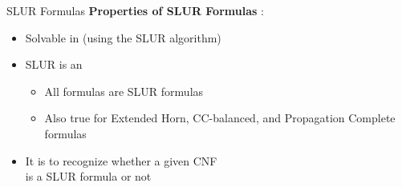 \documentclass[t]{sdqbeamer}
\begin{document}
\begin{frame}{SLUR Formulas}
	\textbf{Properties of SLUR Formulas} \cite{vcepek2012properties}:
	\begin{itemize}
		\item Solvable in  (using the SLUR algorithm)
		\item SLUR is an 
		\begin{itemize}
			\item All  formulas are SLUR formulas
			\item Also true for Extended Horn, CC-balanced, and Propagation Complete formulas
		\end{itemize}
		\pause
		\item It is  to recognize whether a given CNF\\
		is a SLUR formula or not
	\end{itemize}
\end{frame}
\end{document}
